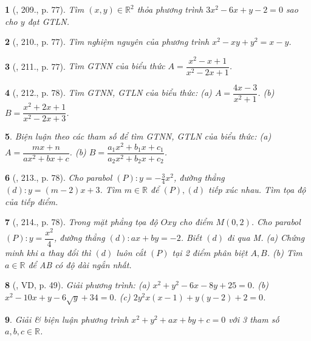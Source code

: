 \documentclass{article}
\newtheorem{baitoan}{}
\begin{document}
\begin{baitoan}[\cite{Tuyen_Toan_9_old}, 209., p. 77]
	Tìm $(x,y)\in\mathbb{R}^2$ thỏa phương trình $3x^2 - 6x + y - 2 = 0$ sao cho $y$ đạt {\rm GTLN}.
\end{baitoan}

\begin{baitoan}[\cite{Tuyen_Toan_9_old}, 210., p. 77]
	Tìm nghiệm nguyên của phương trình $x^2 - xy + y^2 = x - y$.
\end{baitoan}

\begin{baitoan}[\cite{Tuyen_Toan_9_old}, 211., p. 77]
	Tìm {\rm GTNN} của biểu thức $A = \dfrac{x^2 - x + 1}{x^2 - 2x + 1}$.
\end{baitoan}

\begin{baitoan}[\cite{Tuyen_Toan_9_old}, 212., p. 78]
	Tìm {\rm GTNN, GTLN} của biểu thức: (a) $A = \dfrac{4x - 3}{x^2 + 1}$. (b) $B = \dfrac{x^2 + 2x + 1}{x^2 - 2x + 3}$.
\end{baitoan}

\begin{baitoan}
	Biện luận theo các tham số để tìm {\rm GTNN, GTLN} của biểu thức: (a) $A = \dfrac{mx + n}{ax^2 + bx + c}$. (b) $B = \dfrac{a_1x^2 + b_1x + c_1}{a_2x^2 + b_2x + c_2}$.
\end{baitoan}

\begin{baitoan}[\cite{Tuyen_Toan_9_old}, 213., p. 78]
	Cho parabol $(P):y = -\frac{3}{4}x^2$, đường thẳng $(d):y = (m - 2)x + 3$. Tìm $m\in\mathbb{R}$ để $(P),(d)$ tiếp xúc nhau. Tìm tọa độ của tiếp điểm.
\end{baitoan}

\begin{baitoan}[\cite{Tuyen_Toan_9_old}, 214., p. 78]
	Trong mặt phẳng tọa độ $Oxy$ cho điểm $M(0,2)$. Cho parabol $(P):y = \dfrac{x^2}{4}$, đường thẳng $(d):ax + by = -2$. Biết $(d)$ đi qua M. (a) Chứng minh khi $a$ thay đổi thì $(d)$ luôn cắt $(P)$ tại 2 điểm phân biệt $A,B$. (b) Tìm $a\in\mathbb{R}$ để AB có độ dài ngắn nhất.
\end{baitoan}

\begin{baitoan}[\cite{Binh_boi_duong_Toan_9_tap_2}, VD, p. 49]
	Giải phương trình: (a) $x^2 + y^2 - 6x - 8y + 25 = 0$. (b) $x^2 - 10x + y - 6\sqrt{y} + 34 = 0$. (c) $2y^2x(x - 1) + y(y - 2) + 2 = 0$.
\end{baitoan}

\begin{baitoan}
	Giải \& biện luận phương trình $x^2 + y^2 + ax + by + c = 0$ với 3 tham số $a,b,c\in\mathbb{R}$.
\end{baitoan}
\end{document}
